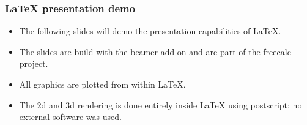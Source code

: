 \begin{frame}
\frametitle{\LaTeX{} presentation demo}
\begin{itemize}
\item The following slides will demo the presentation capabilities of \LaTeX.
\item The slides are build with the beamer add-on and are part of the freecalc project.
\item All graphics are plotted from within \LaTeX.
\item The 2d and 3d rendering is done entirely inside \LaTeX{} using postscript; no external software was used.
\end{itemize}

\end{frame}


